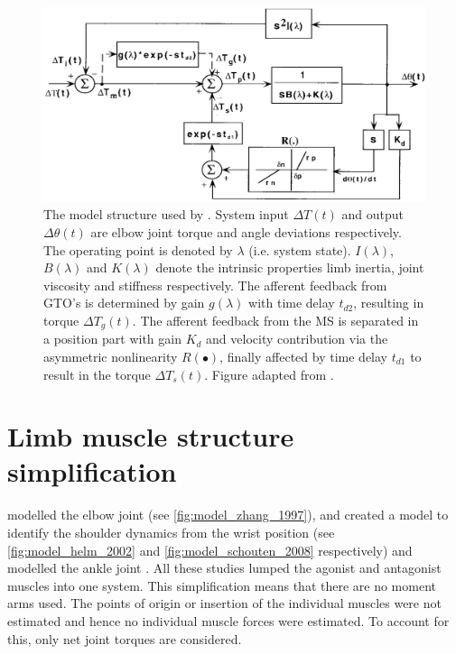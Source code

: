 
\begin{figure}[t]
    \centering
    \includegraphics[width=\linewidth]{Figures/models_assumptions/model_zhang_1997.png}
    \caption{The model structure used by \citeauthor{zhang_simultaneous_1997}. System input $\Delta T(t)$ and output $\Delta \theta (t)$ are elbow joint torque and angle deviations respectively. The operating point is denoted by $\lambda$ (i.e. system state). $I(\lambda)$, $B(\lambda)$ and $K(\lambda)$ denote the intrinsic properties limb inertia, joint viscosity and stiffness respectively. The afferent feedback from GTO's is determined by gain $g(\lambda)$ with time delay $t_{d2}$, resulting in torque $\Delta T_g (t)$. The afferent feedback from the MS is separated in a position part with gain $K_d$ and velocity contribution via the asymmetric nonlinearity $R( \bullet )$, finally affected by time delay $t_{d1}$ to result in the torque $\Delta T_s (t)$. Figure adapted from \citet{zhang_simultaneous_1997}.}
    \label{fig:model_zhang_1997}
\end{figure}




\section{Limb muscle structure simplification}
\citeauthor{zhang_simultaneous_1997} modelled the elbow joint \cite{zhang_simultaneous_1997} (see \autoref{fig:model_zhang_1997}), \citeauthor{van_der_helm_identification_2002} and \citeauthor{schouten_nmclab_2008} created a model to identify the shoulder dynamics from the wrist position \cite{van_der_helm_identification_2002, schouten_nmclab_2008} (see \autoref{fig:model_helm_2002} and \ref{fig:model_schouten_2008} respectively) and \citeauthor{mugge_rigorous_2010} modelled the ankle joint \cite{mugge_rigorous_2010}. All these studies lumped the agonist and antagonist muscles into one system. This simplification means that there are no moment arms used. The points of origin or insertion of the individual muscles were not estimated and hence no individual muscle forces were estimated. To account for this, only net joint torques are considered. 

